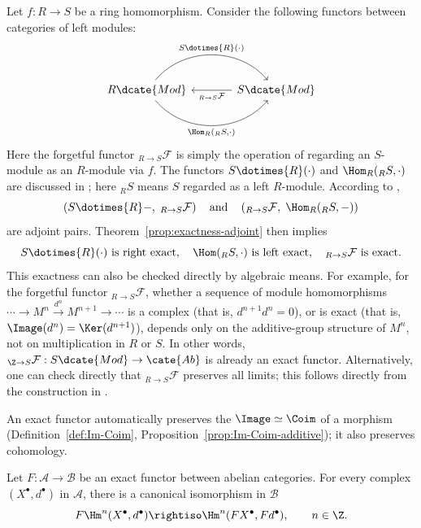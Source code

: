 \begin{example}\label{eg:module-adjoint-pairs}
Let $f:R\to S$ be a ring homomorphism. Consider the following functors between
categories of left modules:
\[\begin{tikzcd}[column sep=large]
	R\dcate{Mod} \arrow[bend left=50, r, "{S \dotimes{R} (\cdot)}"] \arrow[bend right=50, r, "{\Hom_R({}_R S, \cdot)}"'] & S\dcate{Mod} \arrow[l, "{ {}_{R \to S} \mathcal{F} }"]
\end{tikzcd}\]
Here the forgetful functor ${}_{R\to S}\mathcal{F}$ is simply the operation of
regarding an $S$-module as an $R$-module via $f$. The functors
$S\dotimes{R}(\cdot)$ and $\Hom_R({}_R S,\cdot)$ are discussed in
\cite[\S 6.6]{Li1}; here ${}_R S$ means $S$ regarded as a left $R$-module.
According to \cite[Corollary 6.6.8]{Li1},
\[\left(S\dotimes{R}-,\;{}_{R\to S}\mathcal{F}\right)
\quad\text{and}\quad
\left({}_{R\to S}\mathcal{F},\;\Hom_R({}_R S,-)\right)\]
are adjoint pairs. Theorem~\ref{prop:exactness-adjoint} then implies
\[S\dotimes{R}(\cdot)\ \text{is right exact},\quad
\Hom({}_R S,\cdot)\ \text{is left exact},\quad
{}_{R\to S}\mathcal{F}\ \text{is exact}.\]
This exactness can also be checked directly by algebraic means. For example,
for the forgetful functor ${}_{R\to S}\mathcal{F}$, whether a sequence of
module homomorphisms
$\cdots\to M^n\xrightarrow{d^n}M^{n+1}\to\cdots$ is a complex (that is,
$d^{n+1}d^n=0$), or is exact (that is,
$\Image(d^n)=\Ker(d^{n+1})$), depends only on the additive-group structure of
$M^n$, not on multiplication in $R$ or $S$. In other words,
${}_{\Z\to S}\mathcal{F}:S\dcate{Mod}\to\cate{Ab}$ is already an exact
functor. Alternatively, one can check directly that
${}_{R\to S}\mathcal{F}$ preserves all limits; this follows directly from
the construction in \cite[Theorem 6.2.2]{Li1}.
\end{example}
An exact functor automatically preserves the $\Image\simeq\Coim$ of a
morphism (Definition~\ref{def:Im-Coim},
Proposition~\ref{prop:Im-Coim-additive}); it also preserves cohomology.

\begin{proposition}\label{prop:exact-preserves-cohomologies}
Let $F:\mathcal{A}\to\mathcal{B}$ be an exact functor between abelian
categories. For every complex $(X^\bullet,d^\bullet)$ in $\mathcal{A}$, there
is a canonical isomorphism in $\mathcal{B}$
\[F\Hm^n(X^\bullet,d^\bullet)\rightiso
\Hm^n(FX^\bullet,Fd^\bullet),\qquad n\in\Z.\]
\end{proposition}

